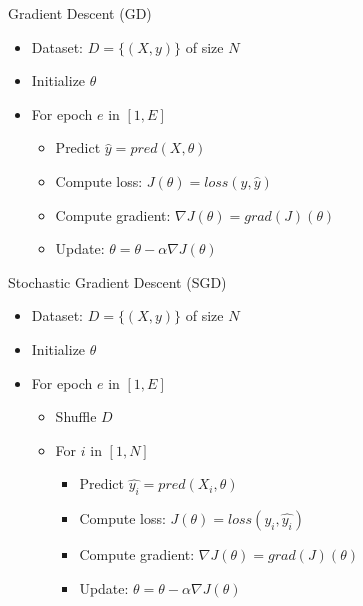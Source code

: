 \documentclass[usenames,dvipsnames]{beamer}
\begin{document}
                        \begin{frame}{Gradient Descent (GD)}
                        \begin{itemize}
                            \item Dataset: $D = \{(X, y)\}$ of size $N$
                            \item Initialize $\theta$
                            \item For epoch $e$ in $[1, E]$
                            \begin{itemize}
                                \item Predict $\hat{y} = pred(X, \theta)$
                                \item Compute loss: $J(\theta) = loss(y, \hat{y})$
                                \item Compute gradient: $\nabla J(\theta) = grad(J)(\theta)$
                                \item Update: $\theta = \theta - \alpha \nabla J(\theta)$
                            \end{itemize}
                        \end{itemize}
                    \end{frame}
                    
                    \begin{frame}{Stochastic Gradient Descent (SGD)}
                        \begin{itemize}
                            \item Dataset: $D = \{(X, y)\}$ of size $N$
                            \item Initialize $\theta$
                            \item For epoch $e$ in $[1, E]$
                            \begin{itemize}
                                \item Shuffle $D$
                                \item For $i$ in $[1, N]$
                                \begin{itemize}
                                    \item Predict $\hat{y_i} = pred(X_i, \theta)$
                                    \item Compute loss: $J(\theta) = loss(y_i, \hat{y_i})$
                                    \item Compute gradient: $\nabla J(\theta) = grad(J)(\theta)$
                                    \item Update: $\theta = \theta - \alpha \nabla J(\theta)$
                                \end{itemize}
                            \end{itemize}
                        \end{itemize}
                    \end{frame}
                    
\end{document}
